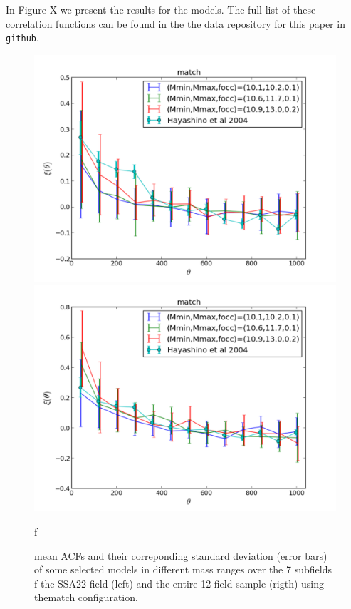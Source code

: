 \documentclass[usenatbib]{mn2e}
\begin{document}
In Figure X we present the results for the models. The full list of
these correlation functions can be found in the the data repository
for this paper in \verb"github". 



\begin{figure}
\begin{center}
\includegraphics[width=0.46\linewidth,angle=0]{./plots/match_large_correlation_selected_models.pdf}
\hspace{5mm}
\includegraphics[width=0.46\linewidth,angle=0]{./plots/match_full_correlation_selected_models.pdf}
\end{center} f
\caption{ mean ACFs   and their correponding standard deviation (error
  bars)  of some selected models in different mass ranges over the 7
  subfields  f the SSA22 field (left) and the entire 12 field sample
  (rigth) using thematch
  configuration. \label{figure:correlation_match} }  
  
\end{figure}
\end{document}
